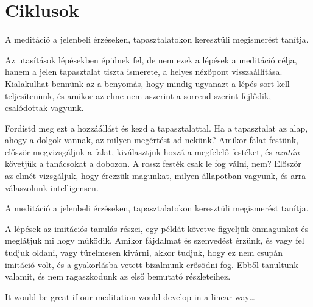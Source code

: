 \hypertarget{ciklusok-1}{%
\chapter{Ciklusok}\label{ciklusok-1}}

A meditáció a jelenbeli érzéseken, tapasztalatokon keresztüli
megismerést tanítja.

Az utasítások lépésekben épülnek fel, de nem ezek a lépések a meditáció
célja, hanem a jelen tapasztalat tiszta ismerete, a helyes nézőpont
visszaállítása. Kialakulhat bennünk az a benyomás, hogy mindig ugyanazt
a lépés sort kell teljesítenünk, és amikor az elme nem aszerint a
sorrend szerint fejlődik, csalódottak vagyunk.

Fordístd meg ezt a hozzáállást és kezd a tapasztalattal. Ha a
tapasztalat az alap, ahogy a dolgok vannak, az milyen megértést ad
nekünk? Amikor falat festünk, először megvizsgáljuk a falat,
kiválasztjuk hozzá a megfelelő festéket, és \emph{azután} követjük a
tanácsokat a dobozon. A rossz festék csak le fog válni, nem? Először az
elmét vizsgáljuk, hogy érezzük magunkat, milyen állapotban vagyunk, és
arra válaszolunk intelligensen.

A meditáció a jelenbeli érzéseken, tapasztalatokon keresztüli
megismerést tanítja.

A lépések az imitációs tanulás részei, egy példát követve figyeljük
önmagunkat és meglátjuk mi hogy működik. Amikor fájdalmat és szenvedést
érzünk, és vagy fel tudjuk oldani, vagy türelmesen kivárni, akkor
tudjuk, hogy ez nem csupán imitáció volt, és a gyakorlásba vetett
bizalmunk erősödni fog. Ebből tanultunk valamit, és nem ragaszkodunk az
első bemutató részleteihez.

It would be great if our meditation would develop in a linear
way\ldots{}
